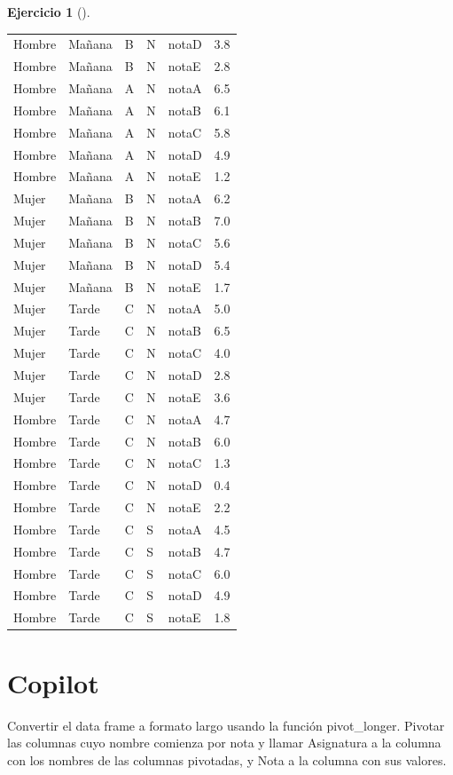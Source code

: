 \documentclass[
  a4paper,
]{scrreport}
\newenvironment{Shaded}{\begin{snugshade}}{\end{snugshade}}
\newcommand{\ExtensionTok}[1]{\textcolor[rgb]{0.00,0.23,0.31}{#1}}
\newcommand{\NormalTok}[1]{\textcolor[rgb]{0.00,0.23,0.31}{#1}}
\theoremstyle{definition}
\newtheorem{exercise}{Ejercicio}[chapter]
\theoremstyle{remark}
\begin{document}
\begin{exercise}[]
\begin{enumerate}
\begin{tcolorbox}
\begin{longtable}[]{@{}lllllr@{}}
  Hombre & Mañana & B & N & notaD & 3.8 \\
  Hombre & Mañana & B & N & notaE & 2.8 \\
  Hombre & Mañana & A & N & notaA & 6.5 \\
  Hombre & Mañana & A & N & notaB & 6.1 \\
  Hombre & Mañana & A & N & notaC & 5.8 \\
  Hombre & Mañana & A & N & notaD & 4.9 \\
  Hombre & Mañana & A & N & notaE & 1.2 \\
  Mujer & Mañana & B & N & notaA & 6.2 \\
  Mujer & Mañana & B & N & notaB & 7.0 \\
  Mujer & Mañana & B & N & notaC & 5.6 \\
  Mujer & Mañana & B & N & notaD & 5.4 \\
  Mujer & Mañana & B & N & notaE & 1.7 \\
  Mujer & Tarde & C & N & notaA & 5.0 \\
  Mujer & Tarde & C & N & notaB & 6.5 \\
  Mujer & Tarde & C & N & notaC & 4.0 \\
  Mujer & Tarde & C & N & notaD & 2.8 \\
  Mujer & Tarde & C & N & notaE & 3.6 \\
  Hombre & Tarde & C & N & notaA & 4.7 \\
  Hombre & Tarde & C & N & notaB & 6.0 \\
  Hombre & Tarde & C & N & notaC & 1.3 \\
  Hombre & Tarde & C & N & notaD & 0.4 \\
  Hombre & Tarde & C & N & notaE & 2.2 \\
  Hombre & Tarde & C & S & notaA & 4.5 \\
  Hombre & Tarde & C & S & notaB & 4.7 \\
  Hombre & Tarde & C & S & notaC & 6.0 \\
  Hombre & Tarde & C & S & notaD & 4.9 \\
  Hombre & Tarde & C & S & notaE & 1.8 \\
  \end{longtable}

  \section{Copilot}

\begin{Shaded}
\begin{Highlighting}[]
\ExtensionTok{Convertir}\NormalTok{ el data frame a formato largo usando la función pivot\_longer. Pivotar las columnas cuyo nombre comienza por nota y llamar Asignatura a la columna con los nombres de las columnas pivotadas, y Nota a la columna con sus valores.}
\end{Highlighting}
\end{Shaded}


\end{tcolorbox}
\end{enumerate}
\end{exercise}
\end{document}
